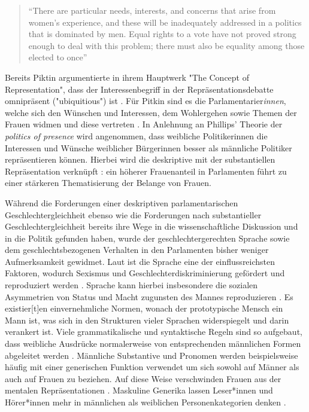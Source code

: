 \documentclass[12pt, 
    twoside=false, 
    bibliography=totoc, 
    numbers=endperiod, 
    headings=normal, 
    toc=chapterentrydotfill
    ]{scrbook}
\begin{document}
\begin{quote}
    \enquote{There are particular needs, interests, and concerns that arise from women's experience, and these will be inadequately addressed in a politics that is dominated by men. Equal rights to a vote have not proved strong enough to deal with this problem; there must also be equality among those elected to once} \parencite[66]{phillips_1998}
\end{quote}

Bereits Piktin \parencite*{pitkin_1972} argumentierte in ihrem Hauptwerk "The Concept of Representation", dass der Interessenbegriff in der Repräsentationsdebatte omnipräsent ("ubiquitious") ist \parencite[69]{wangnerud_2000}. Für Pitkin sind es die Parlamentarier\emph{innen}, welche sich den Wünschen und Interessen, dem Wohlergehen sowie Themen der Frauen widmen und diese vertreten \parencites[vgl.][413]{blaxill_2016}{pitkin_1972}. In Anlehnung an Phillips' Theorie der \emph{politics of presence} \parencite*{phillips_1998} wird angenommen, dass weibliche Politikerinnen die Interessen und Wünsche weiblicher Bürgerinnen besser als männliche Politiker repräsentieren können. Hierbei wird die deskriptive mit der substantiellen Repräsentation verknüpft \parencite[52]{wangnerud_2009}: ein höherer Frauenanteil in Parlamenten führt zu einer stärkeren Thematisierung der Belange von Frauen.

Während die Forderungen einer deskriptiven parlamentarischen Geschlechtergleichheit ebenso wie die Forderungen nach substantieller Geschlechtergleichheit bereits ihre Wege in die wissenschaftliche Diskussion und in die Politik gefunden haben, wurde der geschlechtergerechten Sprache sowie dem geschlechtsbezogenen Verhalten in den Parlamenten bisher weniger Aufmerksamkeit gewidmet. 
Laut \textcite{menegatti_2017} ist die Sprache eine der einflussreichsten Faktoren, wodurch Sexismus und Geschlechterdiskriminierung gefördert und reproduziert werden \parencite*[1]{menegatti_2017}. Sprache kann hierbei insbesondere die sozialen Asymmetrien von Status und Macht zugunsten des Mannes reproduzieren \parencite[1]{menegatti_2017}. Es existier[t]en einvernehmliche Normen, wonach der prototypische Mensch ein Mann ist, was sich in den Strukturen vieler Sprachen widerspiegelt und darin verankert ist. Viele grammatikalische und syntaktische Regeln sind so aufgebaut, dass weibliche Ausdrücke normalerweise von entsprechenden männlichen Formen abgeleitet werden \parencite*[1]{menegatti_2017}. Männliche Substantive und Pronomen werden beispielsweise häufig mit einer generischen Funktion verwendet um sich sowohl auf Männer als auch auf Frauen zu beziehen. Auf diese Weise verschwinden Frauen aus der mentalen Repräsentationen \parencites{vaughan_2018}{stahlberg_2001}. Maskuline Generika lassen Leser*innen und Hörer*innen mehr in männlichen als weiblichen Personenkategorien denken \parencites[2]{sczesny_2016}{stahlberg_2007}.
\end{document}
